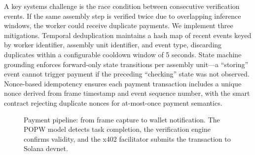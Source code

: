 \documentclass[10pt,twocolumn]{article}
\newcommand{\popw}{POPW}
\begin{document}
A key systems challenge is the race condition between consecutive verification events. If the same assembly step is verified twice due to overlapping inference windows, the worker could receive duplicate payments. We implement three mitigations. Temporal deduplication maintains a hash map of recent events keyed by worker identifier, assembly unit identifier, and event type, discarding duplicates within a configurable cooldown window of 5 seconds. State machine grounding enforces forward-only state transitions per assembly unit---a ``storing'' event cannot trigger payment if the preceding ``checking'' state was not observed. Nonce-based idempotency ensures each payment transaction includes a unique nonce derived from frame timestamp and event sequence number, with the smart contract rejecting duplicate nonces for at-most-once payment semantics.

\begin{figure}[htbp]
\centering
{}
\caption{Payment pipeline: from frame capture to wallet notification. The \popw{} model detects task completion, the verification engine confirms validity, and the x402 facilitator submits the transaction to Solana devnet.}
\label{fig:pipeline}
\end{figure}
\end{document}
